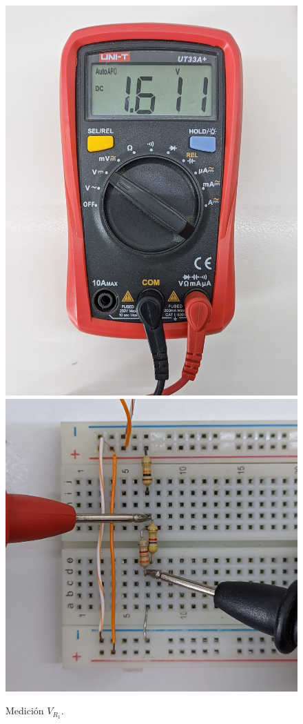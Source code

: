 \documentclass[a4paper,12pt, spanish]{report}
\begin{document}
\begin{figure}[H]
\begin{minipage}{0.3\textwidth}
            \caption{Medición $V_{R_1}$.}
          \end{minipage}
          \begin{minipage}{0.3\textwidth}
            \centering
            \includegraphics[width=1\linewidth]{pictures/mult-v_r2-r3.jpg}
            \includegraphics[width=1\linewidth]{pictures/prot-v_r2-r3.jpg}

\end{minipage}
\end{figure}
\end{document}
